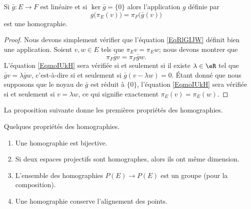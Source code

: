 \begin{lemma}
	Si \( \bar g\colon E\to F\) est linéaire et si \( \ker\bar g=\{ 0 \}\) alors l'application \( g\) définie par
	\begin{equation}        \label{EqRlGIJW}
		g\big( \pi_E(v) \big)=\pi_F\big( \bar g(v) \big)
	\end{equation}
	est une homographie.
\end{lemma}

\begin{proof}
	Nous devons simplement vérifier que l'équation \eqref{EqRlGIJW} définit bien une application. Soient \( v,w\in E\) tels que \( \pi_Ev=\pi_Ew\); nous devons montrer que
	\begin{equation}        \label{EqmoIUkH}
		\pi_F\bar gv=\pi_F\bar gw.
	\end{equation}
	L'équation \eqref{EqmoIUkH} sera vérifiée si et seulement si il existe \( \lambda\in\eR\) tel que \( \bar gv=\lambda\bar gw\), c'est-à-dire si et seulement si \( \bar g(v-\lambda w)=0\). Étant donné que nous supposons que le noyau de \( \bar g\) est réduit à \( \{ 0 \}\), l'équation \eqref{EqmoIUkH} sera vérifiée si et seulement si \( v=\lambda w\), ce qui signifie exactement \( \pi_E(v)=\pi_E(w)\).
\end{proof}

La proposition suivante donne les premières propriétés des homographies.
\begin{proposition}     \label{PROPooGVYXooDIiIbW}
	Quelques propriétés des homographies.
	\begin{enumerate}
		\item       \label{ITEMooTIONooSKjfny}
		      Une homographie est bijective.
		\item
		      Si deux espaces projectifs sont homographes, alors ils ont même dimension.
		\item       \label{ITEMooIZAPooNxEigb}
		      L'ensemble des homographies \( P(E)\to P(E)\) est un groupe (pour la composition).
		\item
		      Une homographie conserve l'alignement des points.
	\end{enumerate}
\end{proposition}

